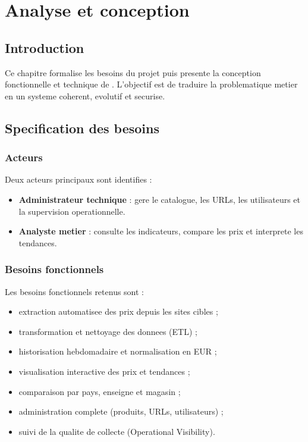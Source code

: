 \chapter{Analyse et conception}

\section{Introduction}
Ce chapitre formalise les besoins du projet puis presente la conception fonctionnelle et technique de \ProjectName. L'objectif est de traduire la problematique metier en un systeme coherent, evolutif et securise.

\section{Specification des besoins}
\subsection{Acteurs}
Deux acteurs principaux sont identifies :
\begin{itemize}[leftmargin=1.2cm]
	\item \textbf{Administrateur technique} : gere le catalogue, les URLs, les utilisateurs et la supervision operationnelle.
	\item \textbf{Analyste metier} : consulte les indicateurs, compare les prix et interprete les tendances.
\end{itemize}

\subsection{Besoins fonctionnels}
Les besoins fonctionnels retenus sont :
\begin{itemize}[leftmargin=1.2cm]
	\item extraction automatisee des prix depuis les sites cibles ;
	\item transformation et nettoyage des donnees (ETL) ;
	\item historisation hebdomadaire et normalisation en EUR ;
	\item visualisation interactive des prix et tendances ;
	\item comparaison par pays, enseigne et magasin ;
	\item administration complete (produits, URLs, utilisateurs) ;
	\item suivi de la qualite de collecte (Operational Visibility).
\end{itemize}

